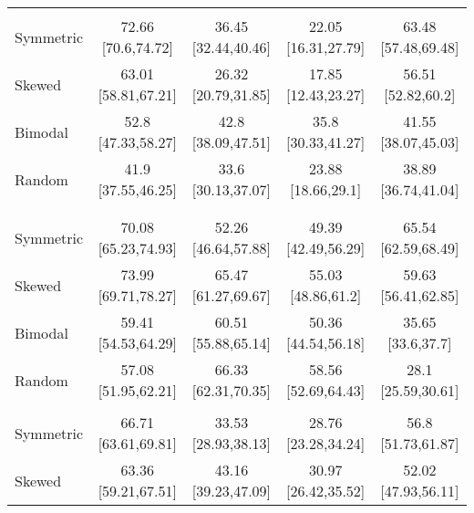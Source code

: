 \begin{tabular}[t]{lcccc}
\addlinespace[0.3em]
\multicolumn{5}{l}{\textbf{30 bins}}\\
\hspace{1em}\hspace{1em}Symmetric & 72.66 [70.6,74.72] & 36.45 [32.44,40.46] & 22.05 [16.31,27.79] & 63.48 [57.48,69.48]\\
\hspace{1em}\hspace{1em}Skewed & 63.01 [58.81,67.21] & 26.32 [20.79,31.85] & 17.85 [12.43,23.27] & 56.51 [52.82,60.2]\\
\hspace{1em}\hspace{1em}Bimodal & 52.8 [47.33,58.27] & 42.8 [38.09,47.51] & 35.8 [30.33,41.27] & 41.55 [38.07,45.03]\\
\hspace{1em}\hspace{1em}Random & 41.9 [37.55,46.25] & 33.6 [30.13,37.07] & 23.88 [18.66,29.1] & 38.89 [36.74,41.04]\\
\addlinespace[0.3em]
\multicolumn{5}{l}{\textbf{15 seconds}}\\
\addlinespace[0.3em]
\multicolumn{5}{l}{\textbf{7 bins}}\\
\hspace{1em}\hspace{1em}Symmetric & 70.08 [65.23,74.93] & 52.26 [46.64,57.88] & 49.39 [42.49,56.29] & 65.54 [62.59,68.49]\\
\hspace{1em}\hspace{1em}Skewed & 73.99 [69.71,78.27] & 65.47 [61.27,69.67] & 55.03 [48.86,61.2] & 59.63 [56.41,62.85]\\
\hspace{1em}\hspace{1em}Bimodal & 59.41 [54.53,64.29] & 60.51 [55.88,65.14] & 50.36 [44.54,56.18] & 35.65 [33.6,37.7]\\
\hspace{1em}\hspace{1em}Random & 57.08 [51.95,62.21] & 66.33 [62.31,70.35] & 58.56 [52.69,64.43] & 28.1 [25.59,30.61]\\
\addlinespace[0.3em]
\multicolumn{5}{l}{\textbf{15 bins}}\\
\hspace{1em}\hspace{1em}Symmetric & 66.71 [63.61,69.81] & 33.53 [28.93,38.13] & 28.76 [23.28,34.24] & 56.8 [51.73,61.87]\\
\hspace{1em}\hspace{1em}Skewed & 63.36 [59.21,67.51] & 43.16 [39.23,47.09] & 30.97 [26.42,35.52] & 52.02 [47.93,56.11]\\

\end{tabular}
